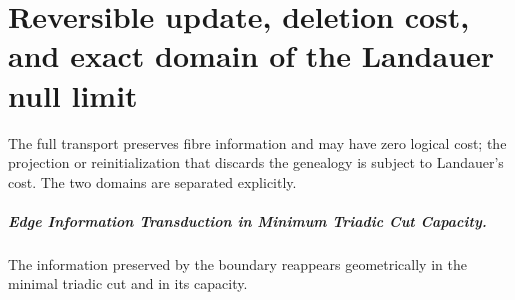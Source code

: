 \chapter{Reversible update, deletion cost, and exact domain of the Landauer null limit}
\label{chap:parte-iv-57}

The full transport preserves fibre information and may have zero logical cost; the projection or reinitialization that discards the genealogy is subject to Landauer's cost. The two domains are separated explicitly.



\paragraph{Edge Information Transduction in Minimum Triadic Cut Capacity.} The information preserved by the boundary reappears geometrically in the minimal triadic cut and in its capacity.
